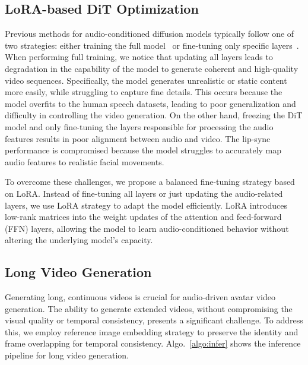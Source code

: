 \subsection{LoRA-based DiT Optimization}
Previous methods for audio-conditioned diffusion models typically follow one of two strategies: either training the full model~\cite{lin2025omnihuman,chen2025hunyuanvideoavatar} or fine-tuning only specific layers~\cite{cui2024hallo3, wang2025fantasytalking}. When performing full training, we notice that updating all layers leads to degradation in the capability of the model to generate coherent and high-quality video sequences. Specifically, the model generates unrealistic or static content more easily, while struggling to capture fine details. This occurs because the model overfits to the human speech datasets, leading to poor generalization and difficulty in controlling the video generation. On the other hand, freezing the DiT model and only fine-tuning the layers responsible for processing the audio features results in poor alignment between audio and video. The lip-sync performance is compromised because the model struggles to accurately map audio features to realistic facial movements.

To overcome these challenges, we propose a balanced fine-tuning strategy based on LoRA. Instead of fine-tuning all layers or just updating the audio-related layers, we use LoRA strategy to adapt the model efficiently. LoRA introduces low-rank matrices into the weight updates of the attention and feed-forward (FFN) layers, allowing the model to learn audio-conditioned behavior without altering the underlying model's capacity. %

\subsection{Long Video Generation}

Generating long, continuous videos is crucial for audio-driven avatar video generation. The ability to generate extended videos, without compromising the visual quality or temporal consistency, presents a significant challenge. To address this, we employ reference image embedding strategy to preserve the identity and frame overlapping for temporal consistency. Algo.~\ref{algo:infer} shows the inference pipeline for long video generation.

